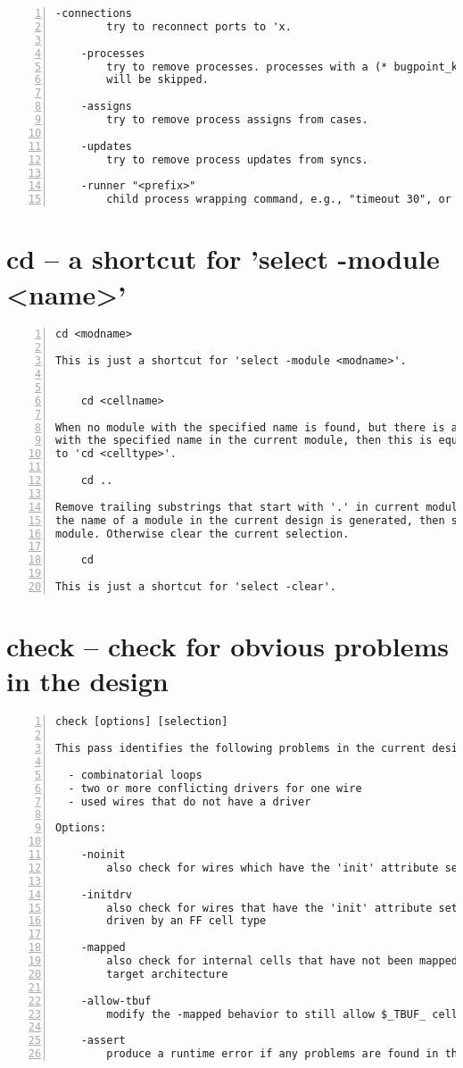 \begin{lstlisting}[numbers=left,frame=single]
    -connections
        try to reconnect ports to 'x.

    -processes
        try to remove processes. processes with a (* bugpoint_keep *) attribute
        will be skipped.

    -assigns
        try to remove process assigns from cases.

    -updates
        try to remove process updates from syncs.

    -runner "<prefix>"
        child process wrapping command, e.g., "timeout 30", or valgrind.
\end{lstlisting}

\section{cd -- a shortcut for 'select -module <name>'}
\label{cmd:cd}
\begin{lstlisting}[numbers=left,frame=single]
    cd <modname>

This is just a shortcut for 'select -module <modname>'.


    cd <cellname>

When no module with the specified name is found, but there is a cell
with the specified name in the current module, then this is equivalent
to 'cd <celltype>'.

    cd ..

Remove trailing substrings that start with '.' in current module name until
the name of a module in the current design is generated, then switch to that
module. Otherwise clear the current selection.

    cd

This is just a shortcut for 'select -clear'.
\end{lstlisting}

\section{check -- check for obvious problems in the design}
\label{cmd:check}
\begin{lstlisting}[numbers=left,frame=single]
    check [options] [selection]

This pass identifies the following problems in the current design:

  - combinatorial loops
  - two or more conflicting drivers for one wire
  - used wires that do not have a driver

Options:

    -noinit
        also check for wires which have the 'init' attribute set

    -initdrv
        also check for wires that have the 'init' attribute set and are not
        driven by an FF cell type

    -mapped
        also check for internal cells that have not been mapped to cells of the
        target architecture

    -allow-tbuf
        modify the -mapped behavior to still allow $_TBUF_ cells

    -assert
        produce a runtime error if any problems are found in the current design
\end{lstlisting}

